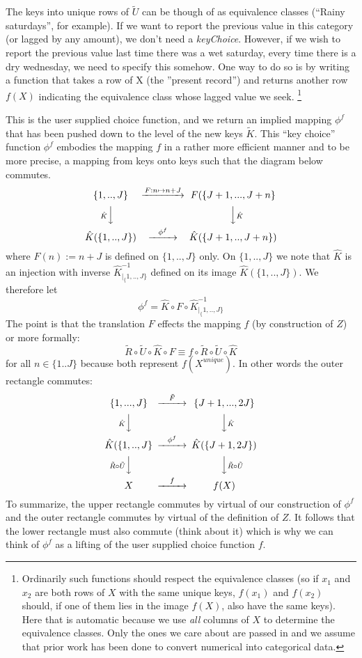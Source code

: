 \documentclass[11pt]{article}
\begin{document}
The keys into unique rows of $\tilde{U}$ can be though of as equivalence classes (``Rainy saturdays'', for example). If we want to report the previous value in this category (or lagged by any amount), we don't need a {\em keyChoice}. However, if we wish to report the previous value last time there was a wet saturday, every time there is a dry wednesday, we need to specify this somehow. One way to do so is by writing a function that takes a row of X (the ''present record'') and returns another row $f(X)$ indicating the equivalence class whose lagged value we seek.
\footnote{Ordinarily such functions should respect the equivalence classes (so if $x_1$ and $x_2$ are both rows of $X$ with the same unique keys, $f(x_1)$ and $f(x_2)$ should, if one of them lies in the image $f(X)$, also have the same keys). Here that is automatic because we use {\em all} columns of $X$ to determine the equivalence classes. Only the ones we care about are passed in and we assume that prior work has been done to convert numerical into categorical data.}  
 

This is the user supplied choice function, and we return an implied mapping $\phi^f$ that has been pushed down to the level of the new keys $\tilde{K}$. This ``key choice'' function $\phi^f$ embodies the mapping $f$ in a rather more efficient manner and to be more precise, a mapping from keys onto keys such that the diagram below commutes. 
$$
\begin{CD}
    \{1,..,J\}  @>{F: n \mapsto n+J}>>  F (\{J+1,...,J+n\} \\
@V{\hat{K}}VV                     @VV{\hat{K}}V\\
     \hat{K}(\{1,..,J\})    @>\phi^f>>   \hat{K}(\{J+1,..,J+n\})
\end{CD}
$$  
where $F(n) := n + J$ is defined on $\{1,..,J\}$ only. On $\{1,..,J\}$ we note that $\hat{K}$ is an injection with inverse $\hat{K}^{-1}_{|_\{1,..,J\}}$ defined on its image $\hat{K}(\{1,..,J\})$. We therefore let
$$
     \phi^f =     \hat{K}  \circ F \circ \hat{K}^{-1}_{|_\{1,..,J\}}
$$
The point is that the translation $F$ effects the mapping $f$ (by construction of $Z$) or more formally: 
$$
   \tilde{R} \circ     \tilde{U} \circ   \hat{K} \circ F \equiv f \circ  \tilde{R} \circ     \tilde{U} \circ   \hat{K}
$$
for all $n \in \{1..J\}$ because both represent $f(X^{unique})$. In other words the outer rectangle commutes:
$$
\begin{CD}
  \{1,...,J\}    @>\tilde{F}>>        \{J+1,...,2J\} \\
@V{\hat{K}}VV                     @VV{\hat{K}}V\\
   \hat{K}(\{1,..,J\}  @>\phi^f>> \hat{K}(\{J+1,2J\}) \\
@V{\tilde{R} \circ \tilde{U}}VV                     @VV{\tilde{R}\circ\tilde{U}} V\\
     X                 @>f>>    f(X)
\end{CD}
$$  
To summarize, the upper rectangle commutes by virtual of our construction of $\phi^f$ and the outer rectangle commutes by virtual of the definition of $Z$. It follows that the lower rectangle must also commute (think about it) which is why we can think of $\phi^f$ as a lifting of the user supplied choice function $f$. 
\end{document}
